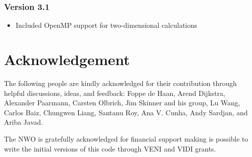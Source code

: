 \documentclass[12pt]{book}
\begin{document}
\subsection{Version 3.1}
\begin{itemize}
\item Included OpenMP support for two-dimensional calculations
\end{itemize}









\chapter{Acknowledgement}
The following people are kindly acknowledged for their contribution through helpful discussions, ideas, and feedback:
Foppe de Haan, Arend Dijkstra, Alexander Paarmann, Carsten Olbrich, Jim Skinner and his group, Lu Wang, Carlos Baiz, Chungwen Liang, Santanu Roy, Ana V. Cunha, Andy Sardjan, and Ariba Javad. 

The NWO is gratefully acknowledged
for financial support making is possible to write the initial versions of this code through VENI and VIDI grants. 

\end{document}

